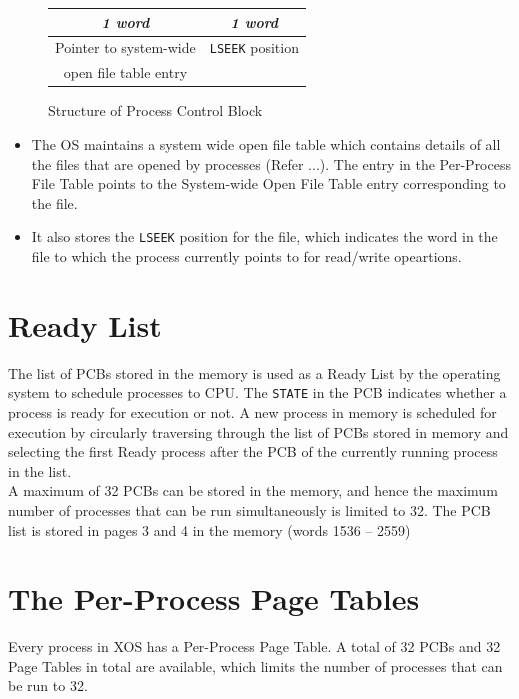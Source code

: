 \documentclass[10pt]{report}
\begin{document}
		\begin{figure}[htp!]
		\centering
		\begin{tabular}{|c|c|}
			\textit{1 word} & \textit{1 word} \\
			\hline
			Pointer to system-wide & \texttt{LSEEK} position\\ open file table entry &  \\
			\hline
		\end{tabular}
		\caption{Structure of Process Control Block}
	\end{figure}
\begin{itemize}
\item
The OS maintains a system wide open file table which contains details of all the files that are opened by processes (Refer ...). The entry in the Per-Process File Table points to the System-wide Open File Table entry corresponding to the file. 
\item It also stores the \texttt{LSEEK} position for the file, which indicates the word in the file to which the process currently points to for read/write opeartions. 
\end{itemize}




\section{Ready List}
\label{lbl:rdylst}

The list of PCBs stored in the memory is used as a Ready List by the operating system to schedule processes to CPU. The \texttt{STATE} in the PCB indicates whether a process is ready for execution or not.  A new process in memory is scheduled for execution by circularly traversing through the list of PCBs stored in memory and selecting the first Ready process after the PCB of the currently running process in the list.\\

A maximum of 32 PCBs can be stored in the memory, and hence the maximum number of processes that can be run simultaneously is limited to 32. The PCB list is stored in pages 3 and 4 in the memory (words 1536 -- 2559)

\section{The Per-Process Page Tables}
\label{lbl:pgtbl}
Every process in XOS has a Per-Process Page Table. A total of 32 PCBs and 32 Page Tables in total are available, which limits the number of processes that can be run to 32. \\
\end{document}
